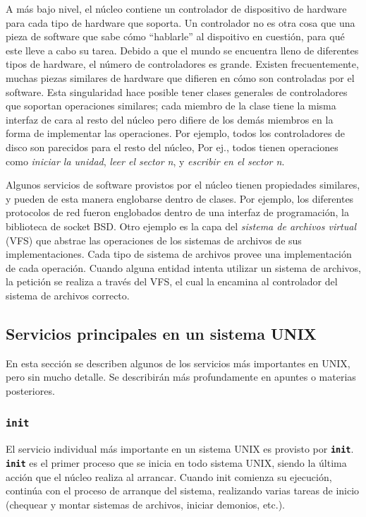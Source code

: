 \documentclass[12pt]{article}
\begin{document}
A más bajo nivel, el núcleo contiene un controlador de dispositivo de
hardware para cada tipo de hardware que soporta. Un controlador no es otra
cosa que una pieza de software que sabe cómo ``hablarle'' al dispoitivo en
cuestión, para qué este lleve a cabo su tarea. Debido a que el mundo se
encuentra lleno de diferentes tipos de hardware, el número de 
controladores es grande. Existen frecuentemente, muchas piezas similares 
de hardware que difieren en cómo son controladas por el software. Esta 
singularidad hace posible tener clases generales de controladores que 
soportan operaciones similares; cada miembro de la clase tiene la misma 
interfaz de cara al resto del núcleo pero difiere de los demás miembros 
en la forma de implementar las operaciones. Por
ejemplo, todos los controladores de disco son parecidos para el resto del
núcleo, Por ej., todos tienen operaciones como \textit{iniciar la unidad},
\textit{leer el sector n}, y \textit{escribir en el sector n}.

Algunos servicios de software provistos por el núcleo tienen propiedades
similares, y pueden de esta manera englobarse dentro de clases. Por 
ejemplo, los diferentes protocolos de red fueron englobados dentro de 
una interfaz de programación, la biblioteca de socket BSD. Otro ejemplo 
es la capa del \textit{sistema de archivos virtual} (VFS) que abstrae 
las operaciones de los sistemas de archivos de sus implementaciones. 
Cada tipo de sistema de archivos provee una implementación de cada 
operación. Cuando alguna entidad intenta utilizar un sistema de archivos,
la petición se realiza a través del VFS, el cual la encamina al 
controlador del sistema de archivos correcto.


\subsection{Servicios principales en un sistema UNIX}

 En esta sección se describen algunos de los servicios más importantes en
UNIX, pero sin mucho detalle. Se describirán más profundamente en apuntes 
o materias posteriores. 

\subsubsection{\texttt{\textbf{init}}}

 El servicio individual más importante en un sistema UNIX es provisto por
\texttt{\textbf{init}}. \texttt{\textbf{init}} es el primer proceso que se
inicia en todo sistema UNIX, siendo la última acción que el núcleo realiza al
arrancar.  Cuando init comienza su ejecución, continúa con el proceso de
arranque del sistema, realizando varias tareas de inicio (chequear y montar
sistemas de archivos, iniciar demonios, etc.).  
\end{document}
